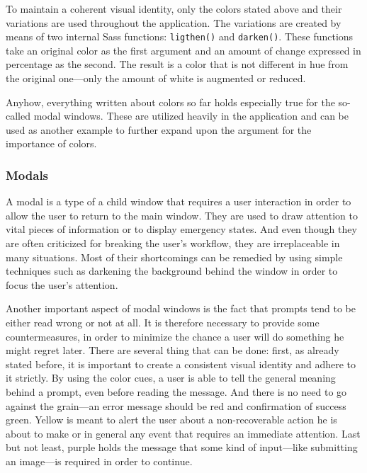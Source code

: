 \documentclass[thesis=M,english,hidelinks]{FITthesis}[2012/10/20]
\newcommand{\code}{\texttt}
\begin{document}
To maintain a coherent visual identity, only the colors stated above and their variations are used throughout the application. The variations are created by means of two internal Sass functions: \code{ligthen()} and \code{darken()}. These functions take an original color as the first argument and an amount of change expressed in percentage as the second. The result is a color that is not different in hue from the original one---only the amount of white is augmented or reduced.

Anyhow, everything written about colors so far holds especially true for the so-called modal windows. These are utilized heavily in the application and can be used as another example to further expand upon the argument for the importance of colors.

    \subsubsection{Modals}

A modal is a type of a child window that requires a user interaction in order to allow the user to return to the main window. They are used to draw attention to vital pieces of information or to display emergency states. And even though they are often criticized for breaking the user's workflow, they are irreplaceable in many situations. Most of their shortcomings can be remedied by using simple techniques such as darkening the background behind the window in order to focus the user's attention.

Another important aspect of modal windows is the fact that prompts tend to be either read wrong or not at all. It is therefore necessary to provide some countermeasures, in order to minimize the chance a user will do something he might regret later. There are several thing that can be done: first, as already stated before, it is important to create a consistent visual identity and adhere to it strictly. By using the color cues, a user is able to tell the general meaning behind a prompt, even before reading the message. And there is no need to go against the grain---an error message should be red and confirmation of success green. Yellow is meant to alert the user about a non-recoverable action he is about to make or in general any event that requires an immediate attention. Last but not least, purple holds the message that some kind of input---like submitting an image---is required in order to continue.
\end{document}
